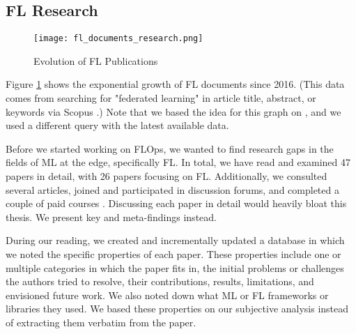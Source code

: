 %
%
%
\subsection{FL Research}\label{subsection:fl_research}

\begin{figure}[h]
    \centering
    \texttt{[image: fl\_documents\_research.png]}
    \caption{Evolution of FL Publications}
    \label{fig:fl_documents_research}
\end{figure}

Figure \ref{fig:fl_documents_research} shows the exponential growth of FL documents
since 2016. (This data comes from searching for "federated learning" in article title, abstract, or keywords via Scopus \cite{scopus_homepage}.)
Note that we based the idea for this graph on \cite{thesis:tum_fl_framework_comparison},
and we used a different query with the latest available data.

Before we started working on FLOps, we wanted to find research gaps in the fields of 
ML at the edge, specifically FL.
In total, we have read and examined 47 papers in detail, with 26 papers focusing on FL. 
Additionally, we consulted several articles,
joined and participated in discussion forums,
and completed a couple of paid courses \cite{udemy_homepage}.
Discussing each paper in detail would heavily bloat this thesis.
We present key and meta-findings instead.

During our reading, we created and incrementally updated a database in which we noted the specific properties of each paper.
These properties include one or multiple categories in which the paper fits in, the initial problems or challenges the authors tried to resolve,
their contributions, results, limitations, and envisioned future work.
We also noted down what ML or FL frameworks or libraries they used.
We based these properties on our subjective analysis instead of extracting them verbatim from the paper.


